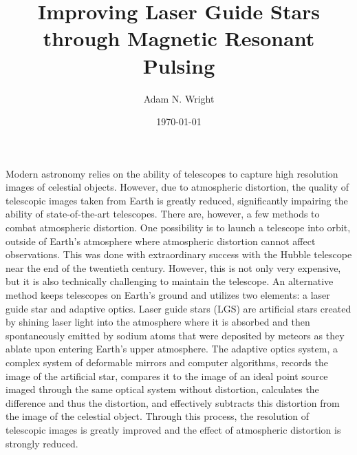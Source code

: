 \documentclass[]{article}
\title{Improving Laser Guide Stars through Magnetic Resonant Pulsing}
\author{Adam N. Wright}
\date{\today}
\begin{document}
\maketitle

\thispagestyle{empty}
\noindent Modern astronomy relies on the ability of telescopes to capture high resolution images of celestial objects. However, due to atmospheric distortion, the quality of telescopic images taken from Earth is greatly reduced, significantly impairing the ability of state-of-the-art telescopes. There are, however, a few methods to combat atmospheric distortion. One possibility is to launch a telescope into orbit, outside of Earth's atmosphere where atmospheric distortion cannot affect observations. This was done with extraordinary success with the Hubble telescope near the end of the twentieth century. However, this is not only very expensive, but it is also technically challenging to maintain the telescope. An alternative method keeps telescopes on Earth's ground and utilizes two elements: a laser guide star and adaptive optics. Laser guide stars (LGS) are artificial stars created by shining laser light into the atmosphere where it is absorbed and then spontaneously emitted by sodium atoms that were deposited by meteors as they ablate upon entering Earth's upper atmosphere. The adaptive optics system, a complex system of deformable mirrors and computer algorithms, records the image of the artificial star, compares it to the image of an ideal point source imaged through the same optical system without distortion, calculates the difference and thus the distortion, and effectively subtracts this distortion from the image of the celestial object. Through this process, the resolution of telescopic images is greatly improved and the effect of atmospheric distortion is strongly reduced.
\end{document}
